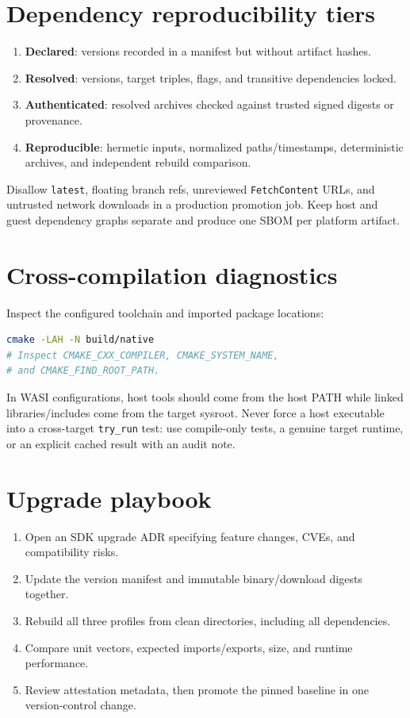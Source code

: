 \documentclass[11pt,letterpaper]{article}
\begin{document}
\section{Dependency reproducibility tiers}
\begin{enumerate}
\item \textbf{Declared}: versions recorded in a manifest but without artifact hashes.
\item \textbf{Resolved}: versions, target triples, flags, and transitive dependencies locked.
\item \textbf{Authenticated}: resolved archives checked against trusted signed digests or provenance.
\item \textbf{Reproducible}: hermetic inputs, normalized paths/timestamps, deterministic archives, and independent rebuild comparison.
\end{enumerate}
Disallow \texttt{latest}, floating branch refs, unreviewed \texttt{FetchContent} URLs, and untrusted network downloads in a production promotion job. Keep host and guest dependency graphs separate and produce one SBOM per platform artifact.

\section{Cross-compilation diagnostics}
Inspect the configured toolchain and imported package locations:
\begin{lstlisting}[language=bash]
cmake -LAH -N build/native
# Inspect CMAKE_CXX_COMPILER, CMAKE_SYSTEM_NAME,
# and CMAKE_FIND_ROOT_PATH.
\end{lstlisting} In WASI configurations, host tools should come from the host PATH while linked libraries/includes come from the target sysroot. Never force a host executable into a cross-target \texttt{try\_run} test: use compile-only tests, a genuine target runtime, or an explicit cached result with an audit note.

\section{Upgrade playbook}
\begin{enumerate}
\item Open an SDK upgrade ADR specifying feature changes, CVEs, and compatibility risks.
\item Update the version manifest and immutable binary/download digests together.
\item Rebuild all three profiles from clean directories, including all dependencies.
\item Compare unit vectors, expected imports/exports, size, and runtime performance.
\item Review attestation metadata, then promote the pinned baseline in one version-control change.
\end{enumerate}
\end{document}
